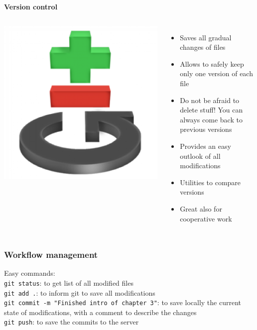 \documentclass[9pt,xcolor=pdftex,dvipsnames,table]{beamer}
\begin{document}
\begin{frame}{\textbf{Version control}}
\begin{columns}
\centering
\includegraphics[width=1\textwidth]{images/git-logo.png}
\begin{itemize}
\item Saves all gradual changes of files
\item Allows to safely keep only one version of each file 
\item Do not be afraid to delete stuff! You can always come back to previous versions
\item Provides an easy outlook of all modifications
\item Utilities to compare versions
\item Great also for cooperative work
\end{itemize}
\end{columns}
\end{frame}


\begin{frame}[fragile] %
\frametitle{\textbf{Workflow management}}
Easy commands: \\
\verb=git status=: to get list of all modified files \\
\verb=git add .=: to inform git to save all modifications \\
\verb=git commit -m "Finished intro of chapter 3"=: to save locally the
current state of modifications, with a comment to describe the changes \\
\verb=git push=: to save the commits to the server
\end{frame}
\end{document}
